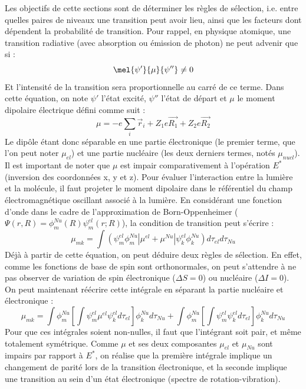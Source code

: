 Les objectifs de cette sections sont de déterminer les règles de sélection, i.e. entre quelles paires de niveaux une transition peut avoir lieu, ainsi que les facteurs dont dépendent la probabilité de transition.\newline
Pour rappel, en physique atomique, une transition radiative (avec absorption ou émission de photon) ne peut advenir que si :
\begin{equation*}
    \mel{\psi'}{\mu}{\psi''} \neq 0
\end{equation*}
Et l'intensité de la transition sera proportionnelle au carré de ce terme.\newline
Dans cette équation, on note $\psi'$ l'état excité, $\psi''$ l'état de départ et $\mu$ le moment dipolaire électrique défini comme suit : 
\begin{equation*}
    \mu = -e\sum\limits_i\Vec{r}_i + Z_1e\Vec{R_1} + Z_2e\Vec{R_2}
\end{equation*}
Le dipôle étant donc séparable en une partie électronique (le premier terme, que l'on peut noter $\mu_{el}$) et une partie nucléaire (les deux derniers termes, notés $\mu_{nucl}$). Il est important de noter que $\mu$ est impair comparativement à l'opération $E^*$ (inversion des coordonnées x, y et z).\newline
Pour évaluer l'interaction entre la lumière et la molécule, il faut projeter le moment dipolaire dans le référentiel du champ électromagnétique oscillant associé à la lumière. En considérant une fonction d'onde dans le cadre de l'approximation de Born-Oppenheimer ($\Psi(r,R) = \phi^{Nu}_m(R)\psi^{el}_m(r;R)$), la condition de transition peut s'écrire :
\begin{equation*}
    \mu_{mk} = \int (\psi^{el}_m\phi^{Nu}_m|\mu^{el} + \mu^{Nu}|\psi^{el}_k\phi^{Nu}_k)d\tau_{el}d\tau_{Nu}
\end{equation*}
Déjà à partir de cette équation, on peut déduire deux règles de sélection. En effet, comme les fonctions de base de spin sont orthonormales, on peut s'attendre à ne pas observer de variation de spin électronique ($\Delta S = 0$) ou nucléaire ($\Delta I =0$). On peut maintenant réécrire cette intégrale en séparant la partie nucléaire et électronique :
\begin{equation*}
    \mu_{mk} = \int \phi^{Nu}_m\left[\int \psi^{el}_m\mu^{el}\psi^{el}_kd\tau_{el} \right]\phi^{Nu}_kd\tau_{Nu} + \int \phi^{Nu}_m\left[\int \psi^{el}_m\psi^{el}_kd\tau_{el} \right]\phi^{Nu}_kd\tau_{Nu}
\end{equation*}
Pour que ces intégrales soient non-nulles, il faut que l'intégrant soit pair, et même totalement symétrique. Comme $\mu$ et ses deux composantes $\mu_{el}$ et $\mu_{Nu}$ sont impairs par rapport à $E^*$, on réalise que la première intégrale implique un changement de parité lors de la transition électronique, et la seconde implique une transition au sein d'un état électronique (spectre de rotation-vibration).

